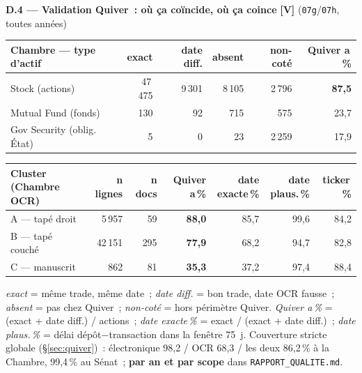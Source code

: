 \documentclass[11pt,a4paper]{article}
\newcommand{\co}[1]{\texttt{\small #1}}
\begin{document}
\textbf{D.4 — Validation Quiver~: où ça coïncide, où ça coince} \hfill {\footnotesize\textbf{[V]} (\co{07g}/\co{07h}, toutes années)}
\begin{center}\small
\begin{tabular}{l rrrr r}
\toprule
\bfseries Chambre — type d'actif & exact & date diff. & absent & non-coté & Quiver a\,\%\\
\midrule
Stock (actions) & 47\,475 & 9\,301 & 8\,105 & 2\,796 & \textbf{87,5} \\
Mutual Fund (fonds) & 130 & 92 & 715 & 575 & 23,7 \\
Gov Security (oblig. État) & 5 & 0 & 23 & 2\,259 & 17,9 \\
\bottomrule
\end{tabular}
\end{center}
\begin{center}\small
\begin{tabular}{l rr rrr r}
\toprule
\bfseries Cluster (Chambre OCR) & n lignes & n docs & Quiver a\,\% & date exacte\,\% & date plaus.\,\% & ticker\,\%\\
\midrule
A — tapé droit & 5\,957 & 59 & \textbf{88,0} & 85,7 & 99,6 & 84,2 \\
B — tapé couché & 42\,151 & 295 & \textbf{77,9} & 68,2 & 94,7 & 82,8 \\
C — manuscrit & 862 & 81 & \textbf{35,3} & 37,2 & 97,4 & 88,4 \\
\bottomrule
\end{tabular}
\end{center}
{\footnotesize \emph{exact} = même trade, même date~; \emph{date diff.} = bon trade, date OCR fausse~;
\emph{absent} = pas chez Quiver~; \emph{non-coté} = hors périmètre Quiver. \emph{Quiver a\,\%} = (exact + date
diff.) / actions~; \emph{date exacte\,\%} = exact / (exact + date diff.)~; \emph{date plaus.\,\%} = délai
dépôt$-$transaction dans la fenêtre 75~j. Couverture stricte globale (§\ref{sec:quiver})~: électronique 98,2 /
OCR 68,3 / les deux 86,2\,\% à la Chambre, 99,4\,\% au Sénat~; \textbf{par an et par scope} dans
\co{RAPPORT_QUALITE.md}.}
\end{document}
